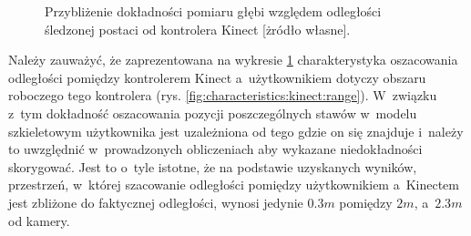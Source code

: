 \pgfplotsset{width=12cm,compat=1.8}
																																							
\begin{savenotes}
	\begin{figure}
		\centering
																																																		
		\caption[Przybliżenie dokładności pomiaru głębi względem odległości śledzonej postaci od kontrolera Kinect]{Przybliżenie dokładności pomiaru głębi względem odległości śledzonej postaci od kontrolera Kinect [żródło własne].}
		\label{fig:characteristics:kinect:distanceAccuracy}
	\end{figure}
\end{savenotes}
																																									
Należy zauważyć, że zaprezentowana na wykresie \ref{fig:characteristics:kinect:distanceAccuracy} charakterystyka oszacowania odległości pomiędzy kontrolerem Kinect a~użytkownikiem dotyczy obszaru roboczego tego kontrolera (rys. \ref{fig:characteristics:kinect:range}). W~związku z~tym dokładność oszacowania pozycji poszczególnych stawów w~modelu szkieletowym użytkownika jest uzależniona od tego gdzie on się znajduje i~należy to uwzględnić w~prowadzonych obliczeniach aby wykazane niedokładności skorygować. Jest to o~tyle istotne, że na podstawie uzyskanych wyników, przestrzeń, w~której szacowanie odległości pomiędzy użytkownikiem a~Kinectem jest zbliżone do faktycznej odległości, wynosi jedynie $0.3m$ pomiędzy $2m$, a~$2.3m$ od kamery.  
																																							

